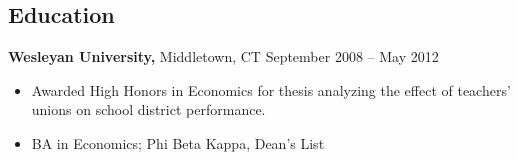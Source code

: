 \documentclass{res}
\begin{document}
\begin{resume}





\section{Education} 
\vspace{2pt}
       {\bf Wesleyan University,} Middletown, CT \hfill September 2008 -- May 2012
  \begin{itemize} \itemsep -2pt
  \item Awarded High Honors in Economics for thesis analyzing the effect of teachers' unions on school district performance.
  \item BA in Economics; Phi Beta Kappa, Dean's List
  \end{itemize}



\end{resume} 
\end{document}
